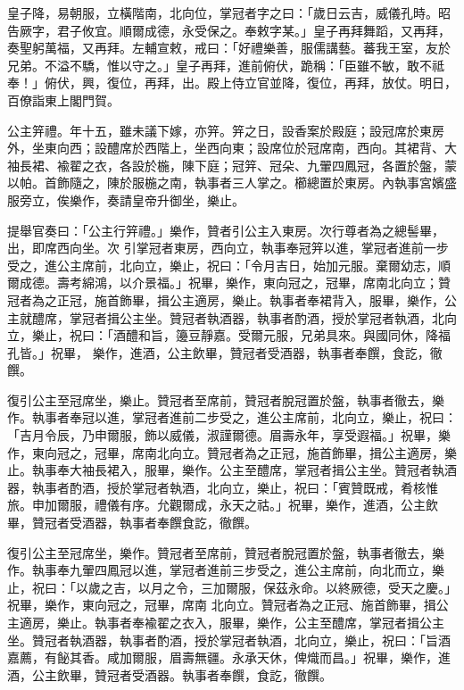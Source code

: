 \begin{pinyinscope}
 皇子降，易朝服，立橫階南，北向位，掌冠者字之曰：「歲日云吉，威儀孔時。昭告厥字，君子攸宜。順爾成德，永受保之。奉敕字某。」皇子再拜舞蹈，又再拜，奏聖躬萬福，又再拜。左輔宣敕，戒曰：「好禮樂善，服儒講藝。蕃我王室，友於兄弟。不溢不驕，惟以守之。」皇子再拜，進前俯伏，跪稱：「臣雖不敏，敢不祗奉！」俯伏，興，復位，再拜，出。殿上侍立官並降，復位，再拜，放仗。明日，百僚詣東上閣門賀。



 公主笄禮。年十五，雖未議下嫁，亦笄。笄之日，設香案於殿庭；設冠席於東房外，坐東向西；設醴席於西階上，坐西向東；設席位於冠席南，西向。其裙背、大袖長裙、褕翟之衣，各設於椸，陳下庭；冠笄、冠朵、九翬四鳳冠，各置於盤，蒙以帕。首飾隨之，陳於服椸之南，執事者三人掌之。櫛總置於東房。內執事宮嬪盛服旁立，俟樂作，奏請皇帝升御坐，樂止。



 提舉官奏曰：「公主行笄禮。」樂作，贊者引公主入東房。次行尊者為之總髻畢，出，即席西向坐。次
 引掌冠者東房，西向立，執事奉冠笄以進，掌冠者進前一步受之，進公主席前，北向立，樂止，祝曰：「令月吉日，始加元服。棄爾幼志，順爾成德。壽考綿鴻，以介景福。」祝畢，樂作，東向冠之，冠畢，席南北向立；贊冠者為之正冠，施首飾畢，揖公主適房，樂止。執事者奉裙背入，服畢，樂作，公主就醴席，掌冠者揖公主坐。贊冠者執酒器，執事者酌酒，授於掌冠者執酒，北向立，樂止，祝曰：「酒醴和旨，籩豆靜嘉。受爾元服，兄弟具來。與國同休，降福孔皆。」祝畢，
 樂作，進酒，公主飲畢，贊冠者受酒器，執事者奉饌，食訖，徹饌。



 復引公主至冠席坐，樂止。贊冠者至席前，贊冠者脫冠置於盤，執事者徹去，樂作。執事者奉冠以進，掌冠者進前二步受之，進公主席前，北向立，樂止，祝曰：「吉月令辰，乃申爾服，飾以威儀，淑謹爾德。眉壽永年，享受遐福。」祝畢，樂作，東向冠之，冠畢，席南北向立。贊冠者為之正冠，施首飾畢，揖公主適房，樂止。執事奉大袖長裙入，服畢，樂作。公主至醴席，掌冠者揖公主坐。贊冠者執酒
 器，執事者酌酒，授於掌冠者執酒，北向立，樂止，祝曰：「賓贊既戒，肴核惟旅。申加爾服，禮儀有序。允觀爾成，永天之祜。」祝畢，樂作，進酒，公主飲畢，贊冠者受酒器，執事者奉饌食訖，徹饌。



 復引公主至冠席坐，樂作。贊冠者至席前，贊冠者脫冠置於盤，執事者徹去，樂作。執事奉九翬四鳳冠以進，掌冠者進前三步受之，進公主席前，向北而立，樂止，祝曰：「以歲之吉，以月之令，三加爾服，保茲永命。以終厥德，受天之慶。」祝畢，樂作，東向冠之，冠畢，席南
 北向立。贊冠者為之正冠、施首飾畢，揖公主適房，樂止。執事者奉褕翟之衣入，服畢，樂作，公主至醴席，掌冠者揖公主坐。贊冠者執酒器，執事者酌酒，授於掌冠者執酒，北向立，樂止，祝曰：「旨酒嘉薦，有飶其香。咸加爾服，眉壽無疆。永承天休，俾熾而昌。」祝畢，樂作，進酒，公主飲畢，贊冠者受酒器。執事者奉饌，食訖，徹饌。




\end{pinyinscope}
